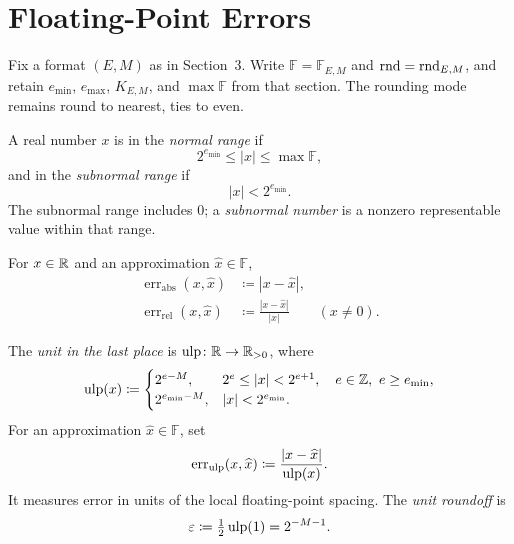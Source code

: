 \section{Floating-Point Errors}

Fix a format $(E, M)$ as in Section~3. Write
$\mathbb F=\mathbb F_{E, M}$ and $\operatorname{rnd}=\operatorname{rnd}_{E, M}$,
and retain $e_{\min}$, $e_{\max}$, $K_{E, M}$, and
$\max\mathbb F$ from that section. The rounding mode remains
round to nearest, ties to even.

\begin{definition}
A real number $x$ is in the \emph{normal range} if
\[
 2^{e_{\min}}\le|x|\le\max\mathbb F,
\]
and in the \emph{subnormal range} if
\[
 |x|<2^{e_{\min}}.
\]
The subnormal range includes $0$; a \emph{subnormal number}
is a nonzero representable value within that range.
\end{definition}

\begin{definition}
For $x\in\mathbb{R}$ and an approximation $\widehat{x}\in\mathbb F$,
\[
 \begin{aligned}
 \operatorname{err}_{\mathrm{abs}}(x, \widehat{x})
  &\coloneqq|x-\widehat{x}|, \\
 \operatorname{err}_{\mathrm{rel}}(x, \widehat{x})
  &\coloneqq\frac{|x-\widehat{x}|}{|x|}\qquad(x\ne0).
 \end{aligned}
\]
\end{definition}

\begin{definition}
The \emph{unit in the last place} is
$\operatorname{ulp}\colon\mathbb{R}\to\mathbb{R}_{>0}$, where
\[
 \operatorname{ulp}(x)\coloneqq
 \begin{cases}
 2^{e-M}, &2^e\le|x|<2^{e+1}, \quad e\in\mathbb Z, \ e\ge e_{\min}, \\
 2^{e_{\min}-M}, &|x|<2^{e_{\min}}.
 \end{cases}
\]
For an approximation $\widehat{x}\in\mathbb F$, set
\[
 \operatorname{err}_{\mathrm{ulp}}(x, \widehat{x})
 \coloneqq\frac{|x-\widehat{x}|}{\operatorname{ulp}(x)}.
\]
It measures error in units of the local floating-point spacing.
The \emph{unit roundoff} is
\[
 \varepsilon\coloneqq\tfrac12\operatorname{ulp}(1)=2^{-M-1}.
\]
\end{definition}


